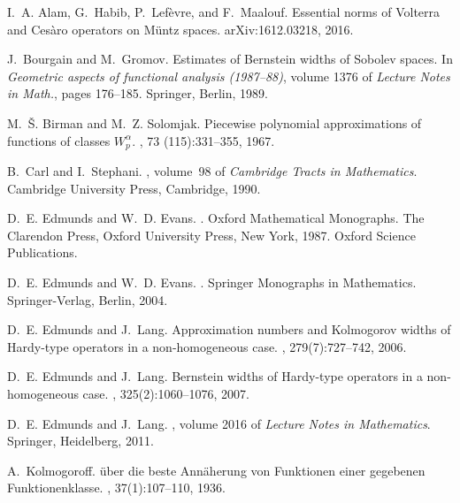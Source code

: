 \documentclass[10pt,reqno]{amsart}
\numberwithin{equation}{section}
\begin{document}
\begin{thebibliography}{AHLM16}

I.~A. Alam, G.~Habib, P.~Lef{\`e}vre, and F.~Maalouf.
\newblock Essential norms of {V}olterra and {C}es{\`a}ro operators on
  {M}{\"u}ntz spaces.
\newblock arXiv:1612.03218, 2016.

J.~Bourgain and M.~Gromov.
\newblock Estimates of {B}ernstein widths of {S}obolev spaces.
\newblock In {\em Geometric aspects of functional analysis (1987--88)}, volume
  1376 of {\em Lecture Notes in Math.}, pages 176--185. Springer, Berlin, 1989.

M.~{\v S}. Birman and M.~Z. Solomjak.
\newblock Piecewise polynomial approximations of functions of classes
  {$W_{p}^{\alpha}$}.
, 73 (115):331--355, 1967.

B.~Carl and I.~Stephani.
,
  volume~98 of {\em Cambridge Tracts in Mathematics}.
\newblock Cambridge University Press, Cambridge, 1990.

D.~E. Edmunds and W.~D. Evans.
.
\newblock Oxford Mathematical Monographs. The Clarendon Press, Oxford
  University Press, New York, 1987.
\newblock Oxford Science Publications.

D.~E. Edmunds and W.~D. Evans.
.
\newblock Springer Monographs in Mathematics. Springer-Verlag, Berlin, 2004.

D.~E. Edmunds and J.~Lang.
\newblock Approximation numbers and {K}olmogorov widths of {H}ardy-type
  operators in a non-homogeneous case.
, 279(7):727--742, 2006.

D.~E. Edmunds and J.~Lang.
\newblock Bernstein widths of {H}ardy-type operators in a non-homogeneous case.
, 325(2):1060--1076, 2007.

D.~E. Edmunds and J.~Lang.
, volume 2016 of {\em Lecture Notes in Mathematics}.
\newblock Springer, Heidelberg, 2011.

A.~Kolmogoroff.
\newblock \"uber die beste {A}nn{\"a}herung von {F}unktionen einer gegebenen
  {F}unktionenklasse.
, 37(1):107--110, 1936.


\end{thebibliography}
\end{document}
